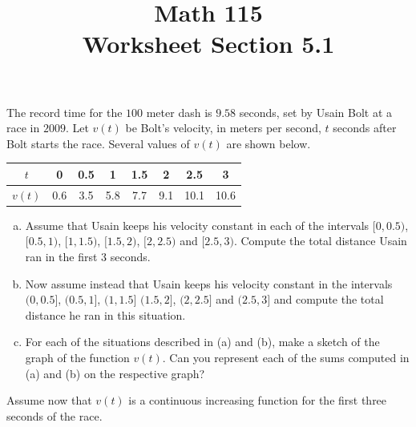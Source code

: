 \documentclass[11pt]{exam}
\title{\vspace{-0.5in} Math 115 \\ Worksheet Section 5.1}
\date{}
\begin{document}
\maketitle
\vspace{-0.75in}
\begin{questions}
  \question The record time for the $100$ meter dash is $9.58$ seconds, set by Usain Bolt at a race in $2009$. Let $v(t)$ be Bolt's velocity, in meters per second, $t$ 
seconds after Bolt starts the race. Several values of $v(t)$ are shown below. 
\begin{center}
\begin{tabular}{|c|c|c|c|c|c|c|c|}
\hline
$t$ &0 & 0.5& 1& 1.5 & 2 & 2.5 & 3 \\
\hline
$v(t)$ & 0.6 & 3.5 & 5.8 &7.7  &9.1 &10.1 &10.6   \\
\hline
\end{tabular}
\end{center}
\begin{enumerate}[(a)]
\item Assume that Usain keeps his velocity constant in each of the
  intervals $[0,0.5)$, $[0.5,1)$, \([1,1.5)\), $[1.5, 2)$, $[2,2.5)$ and $[2.5,3)$. Compute the total distance Usain ran in the first $3$ seconds.

\item Now assume instead that Usain keeps his velocity constant in the
  intervals $(0,0.5]$, $(0.5,1]$, \((1,1.5]\) $(1.5, 2]$, $(2,2.5]$ and $(2.5,3]$ and compute the total distance he ran in this situation.

\item For each of the situations described in (a) and (b), make a sketch of the graph of the function $v(t)$. Can you represent each of the sums computed in (a) and (b) on the 
respective graph?
\end{enumerate}

Assume now that $v(t)$ is a continuous increasing function for the first three seconds of the race.


\end{questions}
\end{document}

